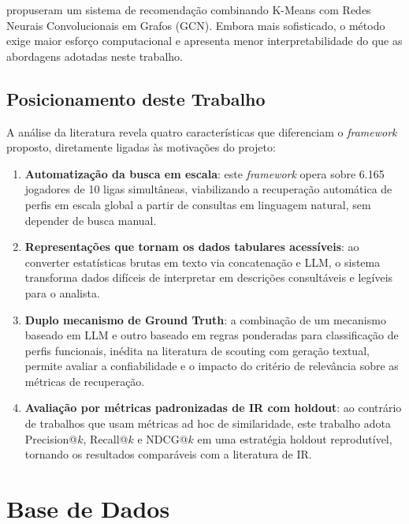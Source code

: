 \documentclass[portuguese]{sbc2025}
\begin{document}
\citet{springer2026} propuseram um sistema de recomendação combinando K-Means com Redes
Neurais Convolucionais em Grafos (GCN). Embora mais sofisticado, o método exige maior
esforço computacional e apresenta menor interpretabilidade do que as abordagens adotadas
neste trabalho.

\subsection{Posicionamento deste Trabalho}

A análise da literatura revela quatro características que diferenciam o
\textit{framework} proposto, diretamente ligadas às motivações do projeto:

\begin{enumerate}
  \item \textbf{Automatização da busca em escala}: este \textit{framework} opera sobre
        6.165 jogadores de 10 ligas simultâneas, viabilizando a recuperação automática
        de perfis em escala global a partir de consultas em linguagem natural, sem
        depender de busca manual.

  \item \textbf{Representações que tornam os dados tabulares acessíveis}: ao converter
        estatísticas brutas em texto via concatenação e LLM, o sistema transforma dados
        difíceis de interpretar em descrições consultáveis e legíveis para o analista.

  \item \textbf{Duplo mecanismo de Ground Truth}: a combinação de um mecanismo baseado
        em LLM e outro baseado em regras ponderadas para classificação de perfis
        funcionais, inédita na literatura de scouting com geração textual, permite
        avaliar a confiabilidade e o impacto do critério de relevância sobre as métricas
        de recuperação.

  \item \textbf{Avaliação por métricas padronizadas de IR com holdout}: ao contrário
        de trabalhos que usam métricas ad hoc de similaridade, este trabalho adota
        Precision@$k$, Recall@$k$ e NDCG@$k$ em uma estratégia holdout reprodutível,
        tornando os resultados comparáveis com a literatura de IR.
\end{enumerate}


\section{Base de Dados}
\label{sec:dataset}
\end{document}
